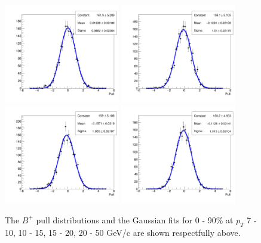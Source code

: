 \begin{figure}[h]
\begin{center}
\includegraphics[width= 0.45\textwidth]{Figures/Chapter5/BP_pull_signal_full_0_0_90.png}
\includegraphics[width= 0.45\textwidth]{Figures/Chapter5/BP_pull_signal_full_1_0_90.png}
\includegraphics[width= 0.45\textwidth]{Figures/Chapter5/BP_pull_signal_full_2_0_90.png}
\includegraphics[width= 0.45\textwidth]{Figures/Chapter5/BP_pull_signal_full_3_0_90.png}
\caption{The $B^+$ pull distributions and the Gaussian fits for 0 - 90\% at $p_T$ 7 - 10, 10 - 15, 15 - 20, 20 - 50 GeV/c are shown respectfully above.} 
\label{BPPtPull} 
\end{center}
\end{figure}

